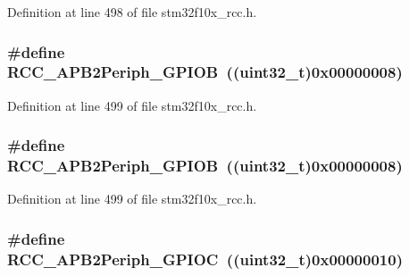 Definition at line 498 of file stm32f10x\+\_\+rcc.\+h.

\subsubsection[{\texorpdfstring{R\+C\+C\+\_\+\+A\+P\+B2\+Periph\+\_\+\+G\+P\+I\+OB}{RCC_APB2Periph_GPIOB}}]{\setlength{\rightskip}{0pt plus 5cm}\#define R\+C\+C\+\_\+\+A\+P\+B2\+Periph\+\_\+\+G\+P\+I\+OB~(({\bf uint32\+\_\+t})0x00000008)}\hypertarget{group___a_p_b2__peripheral_ga8c8909c3640508e9ce31dff80010a6dd}{}\label{group___a_p_b2__peripheral_ga8c8909c3640508e9ce31dff80010a6dd}


Definition at line 499 of file stm32f10x\+\_\+rcc.\+h.

\subsubsection[{\texorpdfstring{R\+C\+C\+\_\+\+A\+P\+B2\+Periph\+\_\+\+G\+P\+I\+OB}{RCC_APB2Periph_GPIOB}}]{\setlength{\rightskip}{0pt plus 5cm}\#define R\+C\+C\+\_\+\+A\+P\+B2\+Periph\+\_\+\+G\+P\+I\+OB~(({\bf uint32\+\_\+t})0x00000008)}\hypertarget{group___a_p_b2__peripheral_ga8c8909c3640508e9ce31dff80010a6dd}{}\label{group___a_p_b2__peripheral_ga8c8909c3640508e9ce31dff80010a6dd}


Definition at line 499 of file stm32f10x\+\_\+rcc.\+h.

\subsubsection[{\texorpdfstring{R\+C\+C\+\_\+\+A\+P\+B2\+Periph\+\_\+\+G\+P\+I\+OC}{RCC_APB2Periph_GPIOC}}]{\setlength{\rightskip}{0pt plus 5cm}\#define R\+C\+C\+\_\+\+A\+P\+B2\+Periph\+\_\+\+G\+P\+I\+OC~(({\bf uint32\+\_\+t})0x00000010)}\hypertarget{group___a_p_b2__peripheral_gaf1f4b467becee1ff31ba2c54328a0115}{}\label{group___a_p_b2__peripheral_gaf1f4b467becee1ff31ba2c54328a0115}


